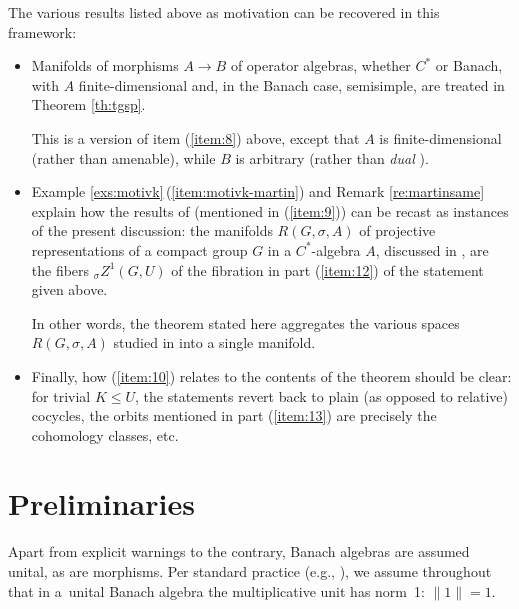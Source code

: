 \documentclass[pdftex]{sigma}
\numberwithin{equation}{section}
\begin{document}
The various results listed above as motivation can be recovered in this framework:
\begin{itemize}\itemsep=0pt
\item Manifolds of morphisms $A\to B$ of operator algebras, whether $C^*$ or Banach, with $A$ finite-dimensional and, in the Banach case, semisimple, are treated in Theorem \ref{th:tgsp}.

 This is a version of item (\ref{item:8}) above, except that $A$ is finite-dimensional (rather than amenable), while $B$ is arbitrary (rather than {\it dual} \cite[Theorem~8.2.3]{run-lec}).

\item Example \ref{exs:motivk}\,(\ref{item:motivk-martin}) and Remark \ref{re:martinsame} explain how the results of \cite{mart-proj} (mentioned in (\ref{item:9})) can be recast as instances of the present discussion: the manifolds $R(G,\sigma,A)$ of projective representations of a compact group $G$ in a $C^*$-algebra $A$, discussed in \cite[Section~1.4]{mart-proj}, are the fibers ${}_{\sigma}Z^1(G,U)$ of the fibration in part (\ref{item:12}) of the statement given above.

 In other words, the theorem stated here aggregates the various spaces $R(G,\sigma,A)$ studied in \cite{mart-proj} into a single manifold.

\item Finally, how (\ref{item:10}) relates to the contents of the theorem should be clear: for trivial $K\le U$, the statements revert back to plain (as opposed to relative) cocycles, the orbits mentioned in part (\ref{item:13}) are precisely the cohomology classes, etc.
\end{itemize}

\section{Preliminaries}\label{se.prel}

Apart from explicit warnings to the contrary, Banach algebras are assumed unital, as are morphisms. Per standard practice (e.g., \cite[Definition~2.1.8]{dales}), we assume throughout that in a~unital Banach algebra the multiplicative unit has norm~1: $\|1\|=1$.
\end{document}
